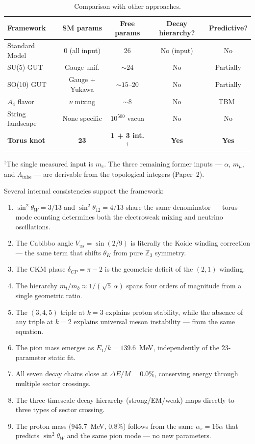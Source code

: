\documentclass[11pt,a4paper]{article}
\begin{document}
\begin{table}[h]
\centering
\caption{Comparison with other approaches.}
\label{tab:comparison}
\small
\begin{tabular}{@{}lcccc@{}}
\toprule
Framework & SM params & Free params & Decay hierarchy? & Predictive? \\
\midrule
Standard Model & 0 (all input) & 26 & No (input) & No \\
SU(5) GUT~\cite{georgi1974} & Gauge unif. & ${\sim}24$ & No & Partially \\
SO(10) GUT & Gauge + Yukawa & ${\sim}15$--20 & No & Partially \\
$A_4$ flavor~\cite{ma2001,altarelli2006} & $\nu$ mixing & ${\sim}8$ & No & TBM~\cite{harrison2002} \\
String landscape~\cite{bousso2000} & None specific & $10^{500}$ vacua & No & No \\
\textbf{Torus knot} & \textbf{23} & \textbf{1 + 3 int.$^\dagger$} & \textbf{Yes} & \textbf{Yes} \\
\bottomrule
\end{tabular}

\medskip
\small $^\dagger$The single measured input is $m_e$. The three remaining former inputs --- $\alpha$, $m_\mu$, and $\Lambda_{\text{tube}}$ --- are derivable from the topological integers (Paper~2).
\end{table}

Several internal consistencies support the framework:
\begin{enumerate}
  \item $\sin^2\theta_W = 3/13$ and $\sin^2\theta_{12} = 4/13$ share the same denominator --- torus mode counting determines both the electroweak mixing and neutrino oscillations.
  \item The Cabibbo angle $V_{us} = \sin(2/9)$ is literally the Koide winding correction --- the same term that shifts $\theta_K$ from pure $\mathbb{Z}_3$ symmetry.
  \item The CKM phase $\delta_{CP} = \pi - 2$ is the geometric deficit of the $(2,1)$ winding.
  \item The hierarchy $m_t/m_b \approx 1/(\sqrt{5}\,\alpha)$ spans four orders of magnitude from a single geometric ratio.
  \item The $(3,4,5)$ triple at $k=3$ explains proton stability, while the absence of any triple at $k=2$ explains universal meson instability --- from the same equation.
  \item The pion mass emerges as $E_1/k = 139.6$~MeV, independently of the 23-parameter static fit.
  \item All seven decay chains close at $\Delta E/M = 0.0\%$, conserving energy through multiple sector crossings.
  \item The three-timescale decay hierarchy (strong/EM/weak) maps directly to three types of sector crossing.
  \item The proton mass (945.7~MeV, 0.8\%) follows from the same $\alpha_s = 16\alpha$ that predicts $\sin^2\theta_W$ and the same pion mode --- no new parameters.
\end{enumerate}
\end{document}
